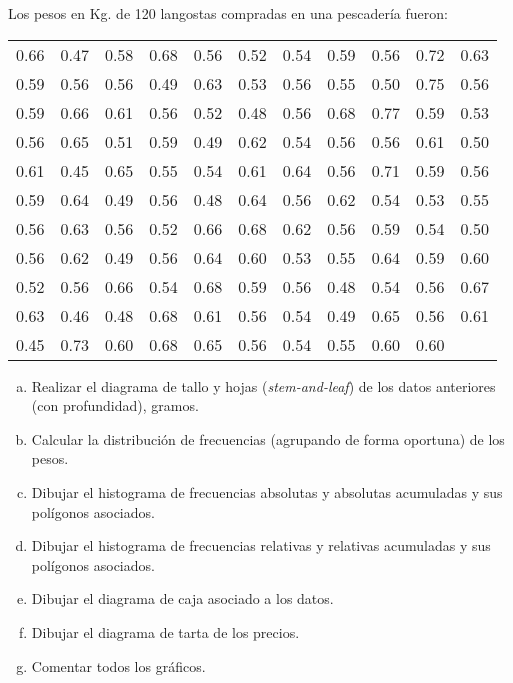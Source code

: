 \documentclass[12pt]{article}
\begin{document}
\begin{prob}
Los pesos en Kg. de 120  langostas compradas en una pescadería fueron:

\begin{tabular}{ccccccccccc}
  0.66  & 0.47  & 0.58 & 0.68   & 0.56   & 0.52   & 0.54   & 0.59   &
0.56   &
  0.72   & 0.63\\
  0.59  & 0.56  & 0.56 & 0.49   & 0.63   & 0.53   & 0.56   & 0.55   &
0.50   &
  0.75   & 0.56 \\
  0.59  & 0.66  & 0.61 & 0.56   & 0.52   & 0.48   & 0.56   & 0.68   &
0.77   &
  0.59   & 0.53 \\
  0.56  & 0.65  & 0.51 & 0.59   & 0.49   & 0.62   & 0.54   & 0.56   &
0.56   &
  0.61   & 0.50 \\
  0.61  & 0.45  & 0.65 & 0.55   & 0.54   & 0.61   & 0.64   & 0.56   &
0.71   &
  0.59   & 0.56 \\
  0.59  & 0.64  & 0.49 & 0.56   & 0.48   & 0.64   & 0.56   & 0.62   &
0.54   &
  0.53   & 0.55 \\
  0.56  & 0.63  & 0.56 & 0.52   & 0.66   & 0.68   & 0.62   & 0.56   &
0.59   &
  0.54   & 0.50 \\
  0.56  & 0.62  & 0.49 & 0.56   & 0.64   & 0.60   & 0.53   & 0.55   &
0.64   &
  0.59   & 0.60 \\
  0.52  & 0.56  & 0.66 & 0.54   & 0.68   & 0.59   & 0.56   & 0.48   &
0.54   &
  0.56   & 0.67 \\
  0.63  & 0.46  & 0.48 & 0.68   & 0.61   & 0.56   & 0.54   & 0.49   &
0.65   &
  0.56   & 0.61 \\
  0.45  & 0.73  & 0.60 & 0.68   & 0.65   & 0.56   & 0.54   & 0.55   &
0.60   & 0.60
\end{tabular}

\begin{enumerate}[a)]
\item Realizar el diagrama de tallo y hojas
(\textit{stem-and-leaf}) de los datos anteriores (con profundidad), gramos.
\item Calcular la distribución de frecuencias (agrupando de forma
oportuna) de los pesos.
\item Dibujar el histograma de frecuencias absolutas y absolutas
acumuladas y sus polígonos asociados.
\item Dibujar el histograma de frecuencias relativas  y relativas
acumuladas y sus polígonos asociados.
\item Dibujar el diagrama de caja asociado a los datos.
\item Dibujar el diagrama de tarta de los precios.
\item Comentar todos los gráficos.
\end{enumerate}
\end{prob}
\end{document}
